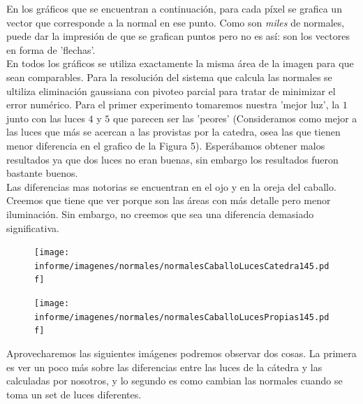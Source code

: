 En los gráficos que se encuentran a continuación, para cada píxel se grafica un vector que corresponde a la normal en ese punto. Como son \textit{miles} de normales, puede dar la impresión de que se grafican puntos pero no es así: son los vectores en forma de 'flechas'. \\

En todos los gráficos se utiliza exactamente la misma área de la imagen para que sean comparables. Para la resolución del sistema que calcula las normales se ultiliza eliminación gaussiana con pivoteo parcial para tratar de minimizar el error numérico. Para el primer experimento tomaremos nuestra 'mejor luz', la $1$ junto con las luces $4$ y $5$ que parecen ser las 'peores' (Consideramos como mejor a las luces que más se acercan a las provistas por la catedra, osea las que tienen menor diferencia en el grafico de la Figura 5). Esperábamos obtener malos resultados ya que dos luces no eran buenas, sin embargo los resultados fueron bastante buenos. \\

Las diferencias mas notorias se encuentran en el ojo y en la oreja del caballo. Creemos que tiene que ver porque son las áreas con más detalle pero menor iluminación. Sin embargo, no creemos que sea una diferencia demasiado significativa.



\begin{figure}[H]
\centering
\begin{minipage}{.5\textwidth}
    \centering
        \texttt{[image: informe/imagenes/normales/normalesCaballoLucesCatedra145.pdf]}
\end{minipage}%
\begin{minipage}{.5\textwidth}
    \centering
        \texttt{[image: informe/imagenes/normales/normalesCaballoLucesPropias145.pdf]} \\
\end{minipage}
\end{figure}

Aprovecharemos las siguientes imágenes podremos observar dos cosas. La primera es ver un poco más sobre las diferencias entre las luces de la cátedra y las calculadas por nosotros, y lo segundo es como cambian las normales cuando se toma un set de luces diferentes. \\

